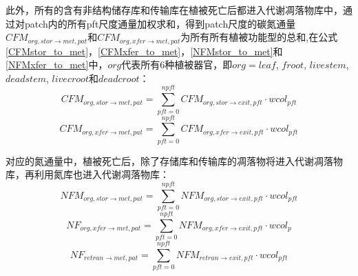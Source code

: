 此外，所有的含有非结构储存库和传输库在植被死亡后都进入代谢凋落物库中，通过对patch内的所有pft尺度通量加权求和，得到patch尺度的碳氮通量$CFM_{org,{stor}\rightarrow met,pat}$和$CFM_{org,xfer\rightarrow met,pat}$为所有所有植被功能型的总和,在公式\eqref{CFMstor_to_met}，\eqref{CFMxfer_to_met}，\eqref{NFMstor_to_met}和\eqref{NFMxfer_to_met}中，$org$代表所有6种植被器官，即$org=leaf$, $froot$, $livestem$, $deadstem$, $livecroot$和$deadcroot$：
\begin{equation}\label{CFMstor_to_met}
  CFM_{org,{stor}\rightarrow met,pat}=\sum_{pft=0}^{npft}{CFM_{org,{stor}\rightarrow exit,pft}\cdot{wcol_{pft}}}
\end{equation}
\begin{equation}\label{CFMxfer_to_met}
  CFM_{org,{xfer}\rightarrow met,pat}=\sum_{pft=0}^{npft}{CFM_{org,{xfer}\rightarrow exit,pft}\cdot{wcol_{pft}}}
\end{equation}

对应的氮通量中，植被死亡后，除了存储库和传输库的凋落物将进入代谢凋落物库，再利用氮库也进入代谢凋落物库：
\begin{equation}\label{NFMstor_to_met}
  NFM_{org,{stor}\rightarrow met,pat}=\sum_{pft=0}^{npft}{NFM_{org,{{stor}\rightarrow exit,pft}}\cdot{wcol_{pft}}}
\end{equation}
\begin{equation}\label{NFMxfer_to_met}
  NF_{org,{xfer}\rightarrow met,pat}=\sum_{pft=0}^{npft}{NFM_{org,{xfer}\rightarrow exit,pft}\cdot{wcol_p}}
\end{equation}
\begin{equation}
  NF_{retran\rightarrow met,pat}=\sum_{pft=0}^{npft}{NFM_{retran\rightarrow exit,pft}\cdot{wcol_{pft}}}
\end{equation}


